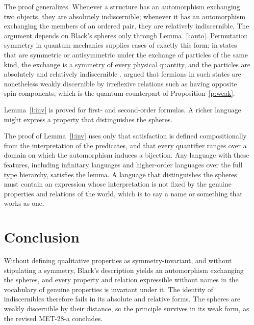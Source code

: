 \documentclass{situationist-preprint}
\begin{document}
The proof generalizes. Whenever a structure has an automorphism exchanging two objects, they are absolutely indiscernible; whenever it has an automorphism exchanging the members of an ordered pair, they are relatively indiscernible. The argument depends on Black's spheres only through Lemma~\ref{l:auto}. Permutation symmetry in quantum mechanics supplies cases of exactly this form: in states that are symmetric or antisymmetric under the exchange of particles of the same kind, the exchange is a symmetry of every physical quantity, and the particles are absolutely and relatively indiscernible \citep{FrenchKrause2006}. \citet{Saunders2006} argued that fermions in such states are nonetheless weakly discernible by irreflexive relations such as having opposite spin components, which is the quantum counterpart of Proposition~\ref{p:weak}.

\begin{objection}
Lemma~\ref{l:inv} is proved for first- and second-order formulas. A richer language might express a property that distinguishes the spheres.
\end{objection}

\begin{reply}
The proof of Lemma~\ref{l:inv} uses only that satisfaction is defined compositionally from the interpretation of the predicates, and that every quantifier ranges over a domain on which the automorphism induces a bijection. Any language with these features, including infinitary languages and higher-order languages over the full type hierarchy, satisfies the lemma. A language that distinguishes the spheres must contain an expression whose interpretation is not fixed by the genuine properties and relations of the world, which is to say a name or something that works as one.
\end{reply}

\section{Conclusion}

Without defining qualitative properties as symmetry-invariant, and without stipulating a symmetry, Black's description yields an automorphism exchanging the spheres, and every property and relation expressible without names in the vocabulary of genuine properties is invariant under it. The identity of indiscernibles therefore fails in its absolute and relative forms. The spheres are weakly discernible by their distance, so the principle survives in its weak form, as the revised MET-28-a concludes.
\end{document}
